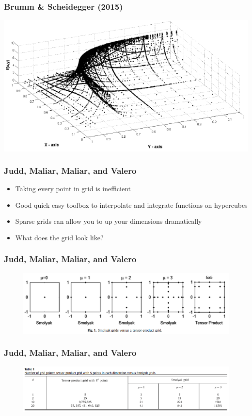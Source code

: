 \documentclass{beamer}
\begin{document}
\begin{frame}
\frametitle[alignment=center]{Brumm \& Scheidegger (2015)}
\includegraphics[scale=0.4]{Brumm_Scheidegger_2015_2.png}
\end{frame}

\begin{frame}
\frametitle[alignment=center]{Judd, Maliar, Maliar, and Valero}
\begin{itemize}
\item Taking every point in grid is inefficient
\bigskip
\item Good quick easy toolbox to interpolate and integrate functions on hypercubes
\bigskip 
\item Sparse grids can allow you to up your dimensions dramatically
\bigskip 
\item What does the grid look like?
\end{itemize}
\end{frame}

\begin{frame}
\frametitle[alignment=center]{Judd, Maliar, Maliar, and Valero}
\begin{figure}
\centering
\includegraphics[scale=0.5]{Smolyak_1.png}
\end{figure}
\end{frame}

\begin{frame}
\frametitle[alignment=center]{Judd, Maliar, Maliar, and Valero}
\begin{figure}
\centering
\includegraphics[scale=0.45]{Smolyak_2.png}
\end{figure}
\end{frame}
\end{document}
